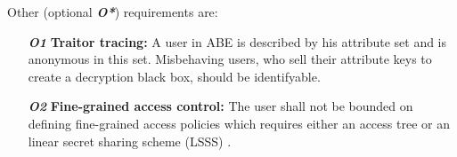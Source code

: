 \noindent Other (optional \textbf{\textit{O*}}) requirements are: 
\begin{itemize}
	\item[\textit{\textbf{O1}}] \textbf{Traitor tracing:} A user in ABE is described by his attribute set and is anonymous in this set. Misbehaving users, who sell their attribute keys to create a decryption black box, should be identifyable. \cite{liu2016practical}
	\item[\textit{\textbf{O2}}] \textbf{Fine-grained access control:} The user shall not be bounded on defining fine-grained access policies which requires either an access tree \cite{bethencourt2007ciphertext} or an linear secret sharing scheme (LSSS) \cite{yang2013dac} \cite{li2016secure} \cite{wu2017security} \cite{li2013matrix} \cite{liu2016practical}.
\end{itemize}